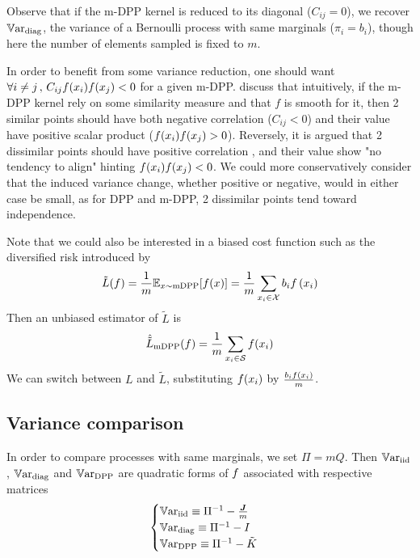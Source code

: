 Observe that if the m-DPP kernel is reduced to its diagonal ($C_{ij} = 0$), we recover $\operatorname{\mathbb V ar}_{\textrm{diag}}$, the variance of a Bernoulli process with same marginals ($\pi_i = b_i$), though here the number of elements sampled is fixed to $m$.

In order to benefit from some variance reduction, one should want $\forall i\neq j \,,\, C_{ij}f(x_i) f(x_j) <0$ for a given m-DPP.
\cite{zhang2017dppminibatch} discuss that intuitively, if the m-DPP kernel rely on some similarity measure and that $f$ is smooth for it, then 2 similar points should have both negative correlation ($C_{ij}<0$) and their value have positive scalar product ($f(x_i) f(x_j) > 0$). Reversely, it is argued that 2 dissimilar points should have positive correlation 
, and their value show "no tendency to align" hinting $f(x_i) f(x_j) < 0$. We could more conservatively consider that the induced variance change, whether positive or negative, would in either case be small, as for DPP and m-DPP, 2 dissimilar points tend toward independence.



Note that we could also be interested in a biased cost function such as the diversified risk introduced by \cite{zhang2017dppminibatch}
$$
\tilde L(f) =\frac{1}{m}\mathbb{E}_{x \sim \textrm{mDPP}}[f(x)]=\frac{1}{m}\sum_{x_i \in \mathcal X} b_{i} f\left(x_{i}\right)
$$
Then an unbiased estimator of $\tilde L$ is
\begin{equation*}
	\hat{\tilde L}_{\textrm{mDPP}}(f) = \frac{1}{m}\sum_{x_i\in \mathcal S} f(x_i)
\end{equation*}
We can switch between $L$ and $\tilde L$, substituting $f(x_i)$ by $\frac{b_i f(x_i)}{m}$.


\subsection{Variance comparison}
In order to compare processes with same marginals, we set $\Pi = mQ$. Then $\operatorname{\mathbb V ar}_{\textrm{iid}}$, $\operatorname{\mathbb V ar}_{\textrm{diag}}$ and $\operatorname{\mathbb V ar}_{\textrm{DPP}}$ are quadratic forms of $f$ associated with respective matrices
$$\begin{cases}
	\operatorname{\mathbb V ar}_{\textrm{iid}} \equiv \Pi^{-1} - \frac{\boldsymbol{J}}{m} \\
	\operatorname{\mathbb V ar}_{\textrm{diag}} \equiv \Pi^{-1} - I \\
	\operatorname{\mathbb V ar}_{\textrm{DPP}} \equiv \Pi^{-1} - \tilde K
\end{cases}$$

